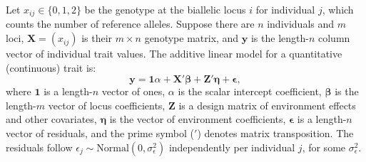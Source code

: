 \documentclass[9pt,lineno]{elife}
\newcommand{\xij}[1][j]{x_{i#1}}
\begin{document}
Let $\xij \in \{ 0, 1, 2 \}$ be the genotype at the biallelic locus $i$ for individual $j$, which counts the number of reference alleles.
Suppose there are $n$ individuals and $m$ loci,
$\mathbf{X} = ( \xij )$ is their $m \times n$ genotype matrix, and
$\mathbf{y}$ is the length-$n$ column vector of individual trait values.
The additive linear model for a quantitative (continuous) trait is:
\begin{equation}
  \label{eq:trait}
  \mathbf{y}
  =
  \mathbf{1} \alpha + \mathbf{X}' \boldsymbol{\beta} + \mathbf{Z}' \boldsymbol{\eta} + \boldsymbol{\epsilon}
  ,
\end{equation}
where
$\mathbf{1}$ is a length-$n$ vector of ones,
$\alpha$ is the scalar intercept coefficient,
$\boldsymbol{\beta}$ is the length-$m$ vector of locus coefficients,
$\mathbf{Z}$ is a design matrix of environment effects and other covariates,
$\boldsymbol{\eta}$ is the vector of environment coefficients,
$\boldsymbol{\epsilon}$ is a length-$n$ vector of residuals,
and the prime symbol ($'$) denotes matrix transposition.
The residuals follow $\epsilon_j \sim \text{Normal}(0, \sigma^2_\epsilon)$ independently per individual $j$, for some $\sigma^2_\epsilon$.
\end{document}
